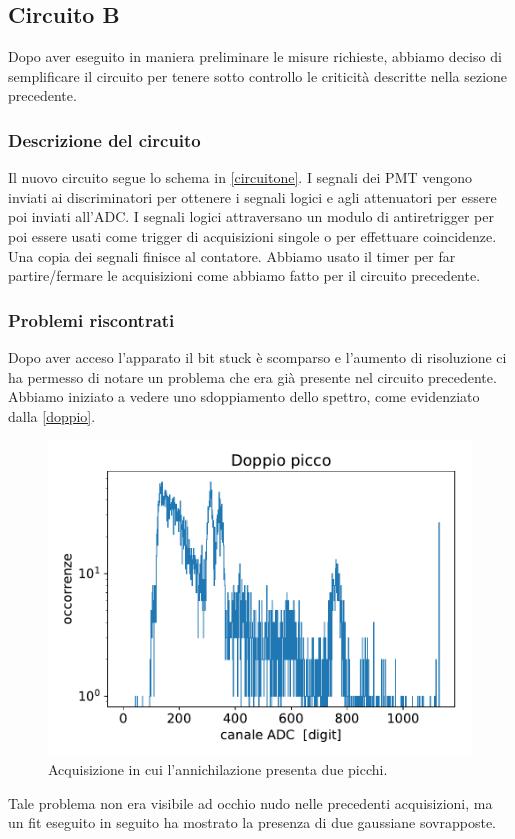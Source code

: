 \subsection{Circuito B}

Dopo aver eseguito in maniera preliminare le misure richieste, abbiamo deciso di semplificare il circuito per tenere sotto controllo le criticità descritte nella sezione precedente.

\subsubsection{Descrizione del circuito}

Il nuovo circuito segue lo schema in \autoref{circuitone}.
I segnali dei PMT vengono inviati ai discriminatori per ottenere i segnali logici e agli attenuatori per essere poi inviati all'ADC. I segnali logici attraversano un modulo di antiretrigger per poi essere usati come trigger di acquisizioni singole o per effettuare coincidenze. Una copia dei segnali finisce al contatore. Abbiamo usato il timer per far partire/fermare le acquisizioni come abbiamo fatto per il circuito precedente.

\subsubsection{Problemi riscontrati}
\label{ref}
Dopo aver acceso l'apparato il bit stuck è scomparso e l'aumento di risoluzione ci ha permesso di notare un problema che era già presente nel circuito precedente. Abbiamo iniziato a vedere uno sdoppiamento dello spettro, come evidenziato dalla \autoref{doppio}. 

\begin{figure}[h]
\centering
\includegraphics[width=20 em]{immagini/doppio}
\caption{Acquisizione in cui l'annichilazione presenta due picchi.}
\label{doppio}
\end{figure}

Tale problema non era visibile ad occhio nudo nelle precedenti acquisizioni, ma un fit eseguito in seguito ha mostrato la presenza di due gaussiane sovrapposte.

